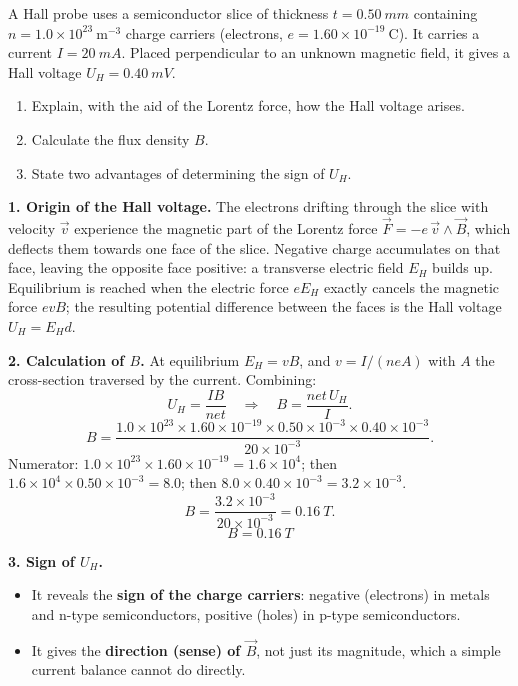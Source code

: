 \documentclass[11pt]{article}
\begin{document}
\begin{exoresolu}
A Hall probe uses a semiconductor slice of thickness $t=\SI{0.50}{mm}$ containing $n=1.0\times10^{23}\ \mathrm{m^{-3}}$ charge carriers (electrons, $e=1.60\times10^{-19}\ \mathrm{C}$). It carries a current $I=\SI{20}{mA}$. Placed perpendicular to an unknown magnetic field, it gives a Hall voltage $U_H=\SI{0.40}{mV}$.
\begin{enumerate}
\item Explain, with the aid of the Lorentz force, how the Hall voltage arises.
\item Calculate the flux density $B$.
\item State two advantages of determining the sign of $U_H$.
\end{enumerate}
\tcblower
\textbf{1. Origin of the Hall voltage.} The electrons drifting through the slice with velocity $\vec{v}$ experience the magnetic part of the Lorentz force $\vec{F}=-e\,\vec{v}\wedge\vec{B}$, which deflects them towards one face of the slice. Negative charge accumulates on that face, leaving the opposite face positive: a transverse electric field $E_H$ builds up. Equilibrium is reached when the electric force $eE_H$ exactly cancels the magnetic force $evB$; the resulting potential difference between the faces is the Hall voltage $U_H=E_H d$.

\textbf{2. Calculation of $B$.} At equilibrium $E_H=vB$, and $v=I/(neA)$ with $A$ the cross-section traversed by the current. Combining:
\[ U_H=\frac{IB}{net}\quad\Longrightarrow\quad B=\frac{net\,U_H}{I}. \]
\[ B=\frac{1.0\times10^{23}\times1.60\times10^{-19}\times0.50\times10^{-3}\times0.40\times10^{-3}}{20\times10^{-3}}. \]
Numerator: $1.0\times10^{23}\times1.60\times10^{-19}=1.6\times10^{4}$; then $1.6\times10^{4}\times0.50\times10^{-3}=8.0$; then $8.0\times0.40\times10^{-3}=3.2\times10^{-3}$.
\[ B=\frac{3.2\times10^{-3}}{20\times10^{-3}}=\SI{0.16}{T}. \]
\[ \boxed{B=\SI{0.16}{T}} \]

\textbf{3. Sign of $U_H$.}
\begin{itemize}
\item It reveals the \textbf{sign of the charge carriers}: negative (electrons) in metals and n-type semiconductors, positive (holes) in p-type semiconductors.
\item It gives the \textbf{direction (sense) of $\vec{B}$}, not just its magnitude, which a simple current balance cannot do directly.
\end{itemize}
\end{exoresolu}
\end{document}
